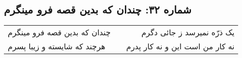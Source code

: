 \begin{center}
\section*{شماره ۳۲: چندان که بدین قصه فرو مینگرم}
\label{sec:032}
\begin{longtable}{l p{0.5cm} r}
چندان که بدین قصه فرو مینگرم
&&
یک ذرّه نمیرسد ز جائی دگرم
\\
هرچند که شایسته و زیبا پسرم
&&
نه کار من است این و نه کار پدرم
\\
\end{longtable}
\end{center}
